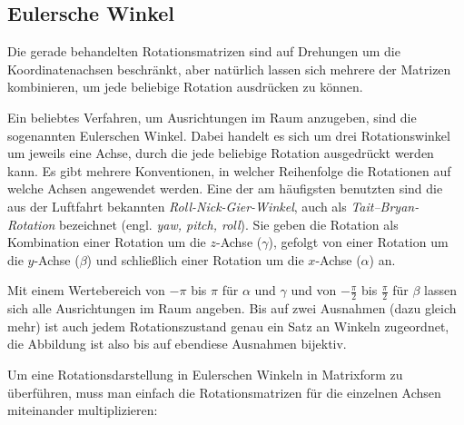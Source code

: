 \subsection{Eulersche Winkel}
Die gerade behandelten Rotationsmatrizen sind auf Drehungen um die Koordinatenachsen beschränkt, aber natürlich lassen sich mehrere der Matrizen kombinieren, um jede beliebige Rotation ausdrücken zu können.

Ein beliebtes Verfahren, um Ausrichtungen im Raum anzugeben, sind die sogenannten Eulerschen Winkel. Dabei handelt es sich um drei Rotationswinkel um jeweils eine Achse, durch die jede beliebige Rotation ausgedrückt werden kann. Es gibt mehrere Konventionen, in welcher Reihenfolge die Rotationen auf welche Achsen angewendet werden. Eine der am häufigsten benutzten sind die aus der Luftfahrt bekannten \emph{Roll-Nick-Gier-Winkel}, auch als \emph{Tait–Bryan-Rotation} bezeichnet (engl. \emph{yaw, pitch, roll}). Sie geben die Rotation als Kombination einer Rotation um die $z$-Achse ($\gamma$), gefolgt von einer Rotation um die $y$-Achse ($\beta$) und schließlich einer Rotation um die $x$-Achse ($\alpha$) an.

Mit einem Wertebereich von $-\pi$ bis $\pi$ für $\alpha$ und $\gamma$ und von $-\frac{\pi}{2}$ bis $\frac{\pi}{2}$ für $\beta$ lassen sich alle Ausrichtungen im Raum angeben. Bis auf zwei Ausnahmen (dazu gleich mehr) ist auch jedem Rotationszustand genau ein Satz an Winkeln zugeordnet, die Abbildung ist also bis auf ebendiese Ausnahmen bijektiv.

Um eine Rotationsdarstellung in Eulerschen Winkeln in Matrixform zu überführen, muss man einfach die Rotationsmatrizen für die einzelnen Achsen miteinander multiplizieren:

